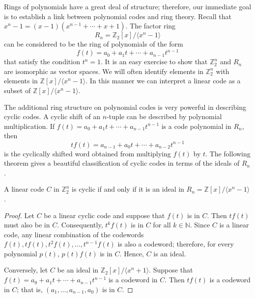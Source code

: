 Rings of polynomials have a great deal of structure; therefore, our immediate goal is to establish a link between polynomial codes and ring theory. Recall that $x^n - 1 = (x - 1)( x^{n-1} + \cdots + x + 1)$.  The factor ring 
\[
R_n = {\mathbb Z}_2[x]/ \langle x^n - 1 \rangle
\]
can be considered to be the ring of polynomials of the form 
\[
f(t) = a_0 + a_1 t + \cdots + a_{n-1} t^{n-1}
\]
that satisfy the condition $t^n = 1$.  It is an easy exercise to show that ${\mathbb Z}_2^n$ and $R_n$ are isomorphic as vector spaces.  We will often identify elements in ${\mathbb Z}_2^n$ with elements in
${\mathbb Z}[x] / \langle x^n - 1 \rangle$.  In this manner we can interpret a linear code as a subset of ${\mathbb Z}[x] / \langle x^n - 1 \rangle$.  

The additional ring structure on polynomial codes is very powerful in describing cyclic codes. A cyclic shift of an $n$-tuple can be described by polynomial multiplication.  If $f(t) = a_0 + a_1 t + \cdots + a_{n-1} t^{n-1}$ is a code polynomial in $R_n$, then
\[
tf(t) = a_{n-1} + a_0 t + \cdots + a_{n-2} t^{n-1}
\]
is the cyclically shifted word obtained from multiplying $f(t)$ by $t$.  The following theorem gives a beautiful classification of cyclic codes in terms of the ideals of $R_n$.

\begin{theorem} \label{finite:cyclic_code_theorem}
A linear code $C$ in ${\mathbb Z}_2^n$ is cyclic if and only if it is an ideal in $R_n = {\mathbb Z}[x] / \langle x^n - 1 \rangle$. 
\end{theorem}
 
\begin{proof}
Let $C$ be a linear cyclic code and suppose that $f(t)$ is in $C$.  Then $t f(t)$ must also be in $C$. Consequently, $t^k f(t)$ is in $C$ for all $k \in {\mathbb N}$.  Since $C$ is a linear code, any linear combination of the codewords $f(t), tf(t), t^2f(t), \ldots, t^{n-1}f(t)$ is also a codeword; therefore, for every polynomial $p(t)$, $p(t)f(t)$ is in $C$.  Hence, $C$ is an ideal. 

Conversely, let $C$ be an ideal in ${\mathbb Z}_2[x]/\langle x^n + 1\rangle$. Suppose that $f(t) = a_0 + a_1 t + \cdots + a_{n - 1} t^{n - 1}$ is a codeword in $C$.  Then $t f(t)$ is a codeword in $C$; that is, $(a_1, \ldots, a_{n-1}, a_0)$ is in $C$.
\end{proof} 

\medskip

